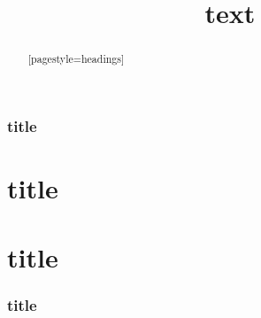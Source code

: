 \documentclass[english,ngerman,cdfoot,twoside,titlepage]{tudscrreprt}
\begin{document}
\null\clearpage
{}

\begin{abstract}[pagestyle=headings]
\blindtext\Blindtext\Blindtext
\end{abstract}

\tableofcontents

\blocking

\section{title}
\part{title}
\title{text}
\part{title}
\makeatletter
\meaning\@@title
\section{title}
\listoffigures
\listoftables
\blinddocument
\end{document}
